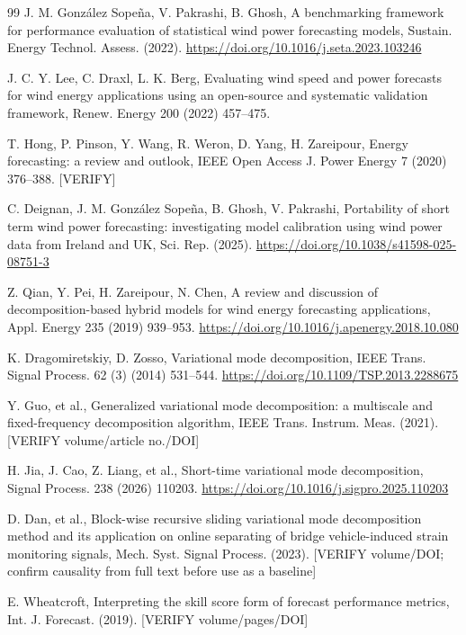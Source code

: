 \documentclass[review,3p,times]{elsarticle}
\begin{document}
\begin{thebibliography}{99}
J. M. González Sopeña, V. Pakrashi, B. Ghosh,
A benchmarking framework for performance evaluation of statistical wind power
forecasting models,
Sustain. Energy Technol. Assess. (2022).
\url{https://doi.org/10.1016/j.seta.2023.103246}

J. C. Y. Lee, C. Draxl, L. K. Berg,
Evaluating wind speed and power forecasts for wind energy applications using an
open-source and systematic validation framework,
Renew. Energy 200 (2022) 457--475.

T. Hong, P. Pinson, Y. Wang, R. Weron, D. Yang, H. Zareipour,
Energy forecasting: a review and outlook,
IEEE Open Access J. Power Energy 7 (2020) 376--388. \textsf{[VERIFY]}

C. Deignan, J. M. González Sopeña, B. Ghosh, V. Pakrashi,
Portability of short term wind power forecasting: investigating model
calibration using wind power data from Ireland and UK,
Sci. Rep. (2025).
\url{https://doi.org/10.1038/s41598-025-08751-3}

Z. Qian, Y. Pei, H. Zareipour, N. Chen,
A review and discussion of decomposition-based hybrid models for wind energy
forecasting applications,
Appl. Energy 235 (2019) 939--953.
\url{https://doi.org/10.1016/j.apenergy.2018.10.080}

K. Dragomiretskiy, D. Zosso,
Variational mode decomposition,
IEEE Trans. Signal Process. 62 (3) (2014) 531--544.
\url{https://doi.org/10.1109/TSP.2013.2288675}

Y. Guo, et al.,
Generalized variational mode decomposition: a multiscale and fixed-frequency
decomposition algorithm,
IEEE Trans. Instrum. Meas. (2021). \textsf{[VERIFY volume/article no./DOI]}

H. Jia, J. Cao, Z. Liang, et al.,
Short-time variational mode decomposition,
Signal Process. 238 (2026) 110203.
\url{https://doi.org/10.1016/j.sigpro.2025.110203}

D. Dan, et al.,
Block-wise recursive sliding variational mode decomposition method and its
application on online separating of bridge vehicle-induced strain monitoring
signals,
Mech. Syst. Signal Process. (2023). \textsf{[VERIFY volume/DOI; confirm
causality from full text before use as a baseline]}

E. Wheatcroft,
Interpreting the skill score form of forecast performance metrics,
Int. J. Forecast. (2019). \textsf{[VERIFY volume/pages/DOI]}


\end{thebibliography}
\end{document}
